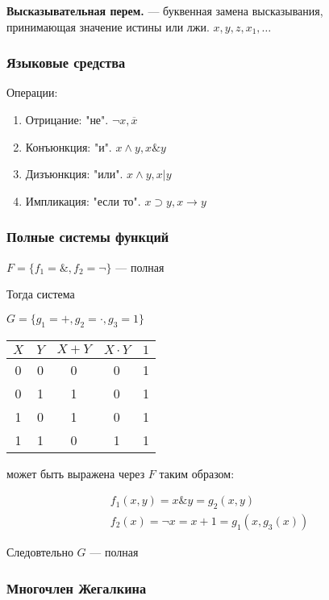 \documentclass{article}
\begin{document}
\textbf{Высказывательная перем.} --- буквенная замена высказывания, \\
принимающая значение истины или лжи. $x, y, z, x_1, \dots$

\subsubsection{Языковые средства}

Операции:

\begin{enumerate}
	\item Отрицание: "не". $\lnot x, \overline{x}$
	\item Конъюнкция: "и". $x \land y, x \& y$
	\item Дизъюнкция: "или". $x \land y, x | y$
	\item Импликация: "если то". $x \supset y, x \to y$
\end{enumerate}

\subsubsection{Полные системы функций}

$F = \{ f_1 = \&, f_2 = \lnot \}$ --- полная

Тогда система

$G = \{ g_1 = +, g_2 = \cdot, g_3 = 1 \}$

\begin{tabular}{c|c||c|c|c}
	$X$ & $Y$ & $X + Y$ & $X \cdot Y$ & $1$ \\
	\hline
	0 & 0 & 0 & 0 & 1 \\
	0 & 1 & 1 & 0 & 1 \\
	1 & 0 & 1 & 0 & 1 \\
	1 & 1 & 0 & 1 & 1 \\
\end{tabular}

может быть выражена через $F$ таким образом:

\begin{gather*}
	f_1(x, y) = x \& y = g_2(x, y) \\
	f_2(x) = \lnot x = x + 1 = g_1(x, g_3(x))
\end{gather*}

Следовтельно $G$ --- полная

\subsubsection{Многочлен Жегалкина}
\end{document}
